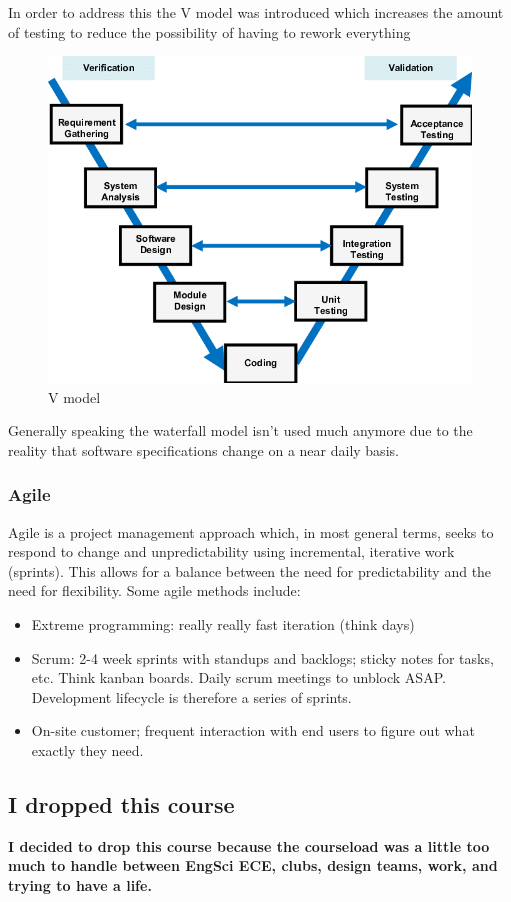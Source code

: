 \documentclass[../notes.tex]{subfiles}
\begin{document}
In order to address this the V model was introduced which increases the amount of testing to reduce the possibility of having to rework everything
\begin{figure}[H]
	\centering
	\includegraphics[width=0.8\linewidth]{img/image_2022-09-14-14-36-18.png}
	\caption{V model}
\end{figure}

Generally speaking the waterfall model isn't used much anymore due to the reality that software specifications change on a near daily basis.


\subsubsection{Agile}

Agile is a project management approach which, in most general terms, seeks to respond to change and unpredictability using incremental, iterative work (sprints).
This allows for a balance between the need for predictability and the need for flexibility.
Some agile methods include:
\begin{itemize}
	\item Extreme programming: really really fast iteration (think days)
	\item Scrum: 2-4 week sprints with standups and backlogs; sticky notes for tasks, etc. Think kanban boards. Daily scrum meetings to unblock ASAP. Development lifecycle is therefore a series of sprints.
	\item On-site customer; frequent interaction with end users to figure out what exactly they need.
\end{itemize}


\subsection{I dropped this course}
\textbf{I decided to drop this course because the courseload was a little too much to handle between EngSci ECE, clubs, design teams, work, and trying to have a life.} 
\end{document}
